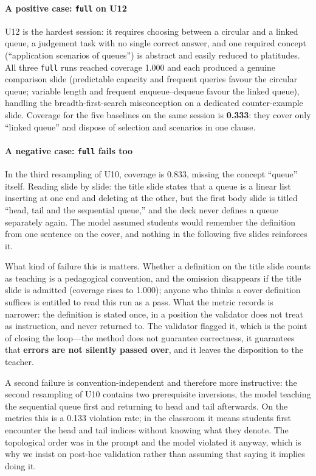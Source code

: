 \documentclass[11pt,a4paper]{article}
\newcommand{\id}[1]{\texttt{#1}}
\begin{document}
\paragraph{A positive case: \id{full} on U12} U12 is the hardest session: it
requires choosing between a circular and a linked queue, a judgement task with no
single correct answer, and one required concept (``application scenarios of
queues'') is abstract and easily reduced to platitudes. All three \id{full} runs
reached coverage 1.000 and each produced a genuine comparison slide (predictable
capacity and frequent queries favour the circular queue; variable length and
frequent enqueue--dequeue favour the linked queue), handling the
breadth-first-search misconception on a dedicated counter-example slide. Coverage
for the five baselines on the same session is \textbf{0.333}: they cover only
``linked queue'' and dispose of selection and scenarios in one clause.

\paragraph{A negative case: \id{full} fails too} In the third resampling of U10,
coverage is 0.833, missing the concept ``queue'' itself. Reading slide by slide:
the title slide states that a queue is a linear list inserting at one end and
deleting at the other, but the first body slide is titled ``head, tail and the
sequential queue,'' and the deck never defines a queue separately again. The
model assumed students would remember the definition from one sentence on the
cover, and nothing in the following five slides reinforces it.

What kind of failure this is matters. Whether a definition on the title slide
counts as teaching is a pedagogical convention, and the omission disappears if the
title slide is admitted (coverage rises to 1.000); anyone who thinks a cover
definition suffices is entitled to read this run as a pass. What the metric
records is narrower: the definition is stated once, in a position the validator
does not treat as instruction, and never returned to. The validator flagged it,
which is the point of closing the loop---the method does not guarantee
correctness, it guarantees that \textbf{errors are not silently passed over}, and
it leaves the disposition to the teacher.

A second failure is convention-independent and therefore more instructive: the
second resampling of U10 contains two prerequisite inversions, the model teaching
the sequential queue first and returning to head and tail afterwards. On the
metrics this is a 0.133 violation rate; in the classroom it means students first
encounter the head and tail indices without knowing what they denote. The
topological order was in the prompt and the model violated it anyway, which is
why we insist on post-hoc validation rather than assuming that saying it implies
doing it.
\end{document}
